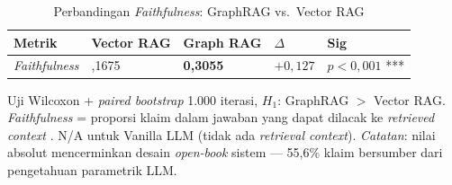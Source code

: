 \renewcommand{\arraystretch}{1.3}
\captionsetup[table]{justification=raggedright,singlelinecheck=false}
\begin{table}[H]
\caption{Perbandingan \textit{Faithfulness}: GraphRAG vs.\ Vector RAG}
\label{tbl:faithfulness_comparison}
\centering
\begin{tabular}{| p{} | >{\centering\arraybackslash}p{} | >{\centering\arraybackslash}p{} | >{\centering\arraybackslash}p{} | >{\centering\arraybackslash}p{} |}
\hline
\textbf{Metrik} & \textbf{Vector RAG} & \textbf{Graph RAG} & \textbf{$\Delta$} & \textbf{Sig} \\
\hline
\textit{Faithfulness} & 0,1675 & \textbf{0,3055} & $+0{,}127$ & $p<0{,}001$ *** \\
\hline
\end{tabular}
\end{table}
{\small\noindent Uji Wilcoxon + \textit{paired bootstrap} 1.000 iterasi, $H_1$: GraphRAG $>$ Vector RAG. \textit{Faithfulness} = proporsi klaim dalam jawaban yang dapat dilacak ke \textit{retrieved context} \parencite{es_ragas_2023}. N/A untuk Vanilla LLM (tidak ada \textit{retrieval context}). \textit{Catatan}: nilai absolut mencerminkan desain \textit{open-book} sistem --- 55,6\% klaim bersumber dari pengetahuan parametrik LLM.}
